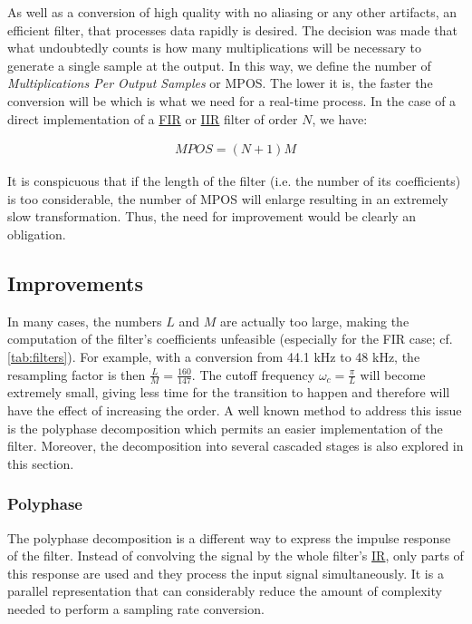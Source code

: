 As well as a conversion of high quality with no aliasing or any other artifacts, an efficient filter, that processes data rapidly is desired. The decision was made that what undoubtedly counts is how many multiplications will be necessary to generate a single sample at the output. In this way, we define the number of \textit{Multiplications Per Output Samples} or MPOS. The lower it is, the faster the conversion will be which is what we need for a real-time process. In the case of a direct implementation of a \hyperlink{FIR}{FIR} or  \hyperlink{IIR}{IIR} filter of order $N$, we have:

\begin{align}
	MPOS = (N + 1)M \label{eqn:mpos_direct} 
\end{align} 

It is conspicuous that if the length of the filter (i.e. the  number of its coefficients) is too considerable, the number of MPOS will enlarge resulting in an extremely slow transformation. Thus, the need for improvement would be clearly an obligation.
\subsection{Improvements} 

In many cases, the numbers $L$ and $M$ are actually too large, making the computation of the filter's coefficients unfeasible (especially for the FIR case; cf. \ref{tab:filters}). For example, with a conversion from 44.1 kHz to 48 kHz, the resampling factor is then $\frac{L}{M} = \frac{160}{147}$. The cutoff frequency $\omega_c = \frac{\pi}{L}$ will become extremely small, giving less time for the transition to happen and therefore will have the effect of increasing the order. A well known method to address this issue is the polyphase decomposition which permits an easier implementation of the filter. Moreover, the decomposition into several cascaded stages is also explored in this section.


\subsubsection{Polyphase}

The polyphase decomposition is a different way to express the impulse response of the filter. Instead of convolving the signal by the whole filter's \hyperlink{IR}{IR}, only parts of this response are used and they process the input signal simultaneously.
 It is a parallel representation that can considerably reduce the amount of complexity needed to perform a sampling rate conversion. 

